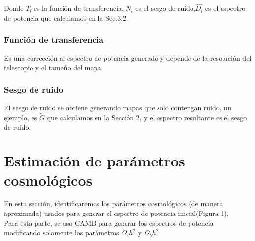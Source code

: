 \documentclass[a4paper]{article}
\begin{document}
Donde  $T_l$ es la función de transferencia, $N_l$ es el sesgo de ruido,$\hat{D_l}$ es el espectro de potencia que calculamos en la Sec.3.2.
 \subsubsection{Función de transferencia}
 Es una corrección al espectro de potencia generado y depende de la resolución del telescopio y el tamaño del mapa.
 
\subsubsection{Sesgo de ruido}
El sesgo de ruido se obtiene generando mapas que solo contengan ruido, un ejemplo, es $\tilde{G}$ que calculamos en la Sección 2, y el espectro resultante es el sesgo de ruido.

\section{Estimación de parámetros cosmológicos}

En esta sección, identificaremos los parámetros cosmológicos (de manera aproximada) usados para generar el espectro de potencia inicial(Figura 1). \\

Para esta parte, se uso CAMB para generar los espectros de potencia modificando solamente los parámetros $\Omega_c h^2$ y $\Omega_b h^2$\\
\end{document}
